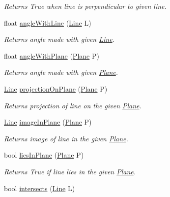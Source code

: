 \begin{DoxyCompactItemize}
\begin{DoxyCompactList}\small\item\em Returns True when line is perpendicular to given line. \end{DoxyCompactList}\item 
float \mbox{\hyperlink{class_line_aefe5ec3e42ab38c1f60e65ca09f0fd29}{angle\+With\+Line}} (\mbox{\hyperlink{class_line}{Line}} L)
\begin{DoxyCompactList}\small\item\em Returns angle made with given \mbox{\hyperlink{class_line}{Line}}. \end{DoxyCompactList}\item 
float \mbox{\hyperlink{class_line_abd11dc16386ee1d5424deac55dea0d1b}{angle\+With\+Plane}} (\mbox{\hyperlink{class_plane}{Plane}} P)
\begin{DoxyCompactList}\small\item\em Returns angle made with given \mbox{\hyperlink{class_plane}{Plane}}. \end{DoxyCompactList}\item 
\mbox{\hyperlink{class_line}{Line}} \mbox{\hyperlink{class_line_af20457df1ce948794350fab12c16ee14}{projection\+On\+Plane}} (\mbox{\hyperlink{class_plane}{Plane}} P)
\begin{DoxyCompactList}\small\item\em Returns projection of line on the given \mbox{\hyperlink{class_plane}{Plane}}. \end{DoxyCompactList}\item 
\mbox{\hyperlink{class_line}{Line}} \mbox{\hyperlink{class_line_a12787f5d97b7764c5b1836fb9007fb86}{image\+In\+Plane}} (\mbox{\hyperlink{class_plane}{Plane}} P)
\begin{DoxyCompactList}\small\item\em Returns image of line in the given \mbox{\hyperlink{class_plane}{Plane}}. \end{DoxyCompactList}\item 
bool \mbox{\hyperlink{class_line_aad7d2a0b6ac395a1bd81d55dd2b7a81d}{lies\+In\+Plane}} (\mbox{\hyperlink{class_plane}{Plane}} P)
\begin{DoxyCompactList}\small\item\em Returns True if line lies in the given \mbox{\hyperlink{class_plane}{Plane}}. \end{DoxyCompactList}\item 
bool \mbox{\hyperlink{class_line_a01b3547f05e338ab7d7a4989d379c432}{intersects}} (\mbox{\hyperlink{class_line}{Line}} L)

\end{DoxyCompactItemize}
